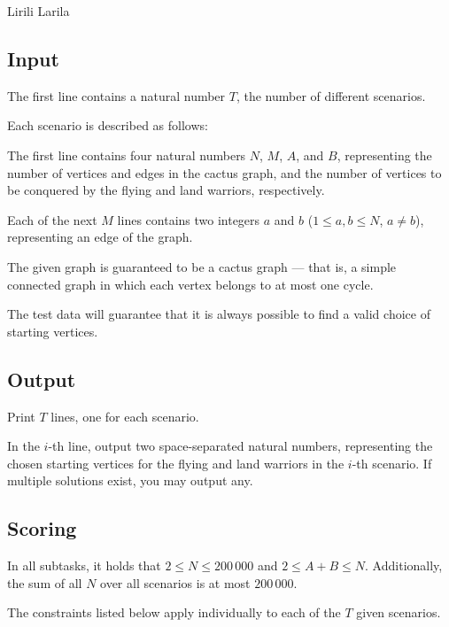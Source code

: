 \begin{statement}[
  problempoints=100,
  timelimit=2 seconds,
  memorylimit=512 MiB,
]{Lirili Larila}
\subsection*{Input}

The first line contains a natural number $T$, the number of different scenarios.

Each scenario is described as follows:

The first line contains four natural numbers $N$, $M$, $A$, and $B$, representing 
the number of vertices and edges in the cactus graph, and the number of vertices 
to be conquered by the flying and land warriors, respectively.

Each of the next $M$ lines contains two integers $a$ and $b$ ($1 \leq a, b \leq N$, $a \neq b$),  
representing an edge of the graph.

The given graph is guaranteed to be a cactus graph — that is, a simple connected graph 
in which each vertex belongs to at most one cycle.

The test data will guarantee that it is always possible to find a valid choice of starting vertices.

\subsection*{Output}

Print $T$ lines, one for each scenario.

In the $i$-th line, output two space-separated natural numbers, 
representing the chosen starting vertices for the flying and land warriors 
in the $i$-th scenario.  
If multiple solutions exist, you may output any.

\subsection*{Scoring}

In all subtasks, it holds that $2 \leq N \leq 200\,000$ and $2 \leq A + B \leq N$.  
Additionally, the sum of all $N$ over all scenarios is at most $200\,000$.

The constraints listed below apply individually to each of the $T$ given scenarios.


\end{statement}
